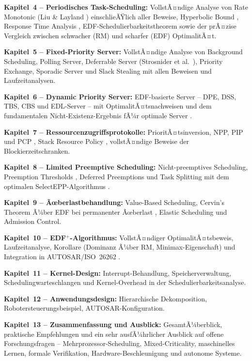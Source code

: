 ﻿\documentclass[a4paper,12pt]{report}
\theoremstyle{definition}
\begin{document}
\textbf{Kapitel~4 -- Periodisches Task-Scheduling:} VollstÃ¤ndige Analyse von
Rate Monotonic (Liu \& Layland \cite{Liu1973}) einschlieÃŸlich aller Beweise,
Hyperbolic Bound \cite{Bini2001}, Response Time Analysis \cite{Audsley1993},
EDF-Schedulierbarkeitstheorem \cite{Baruah1990} sowie der prÃ¤zise Vergleich
zwischen schwacher (RM) und scharfer (EDF) OptimalitÃ¤t.

\textbf{Kapitel~5 -- Fixed-Priority Server:} VollstÃ¤ndige Analyse von
Background Scheduling, Polling Server, Deferrable Server (Strosnider et al.\
\cite{Strosnider1995}), Priority Exchange, Sporadic Server \cite{Sprunt1989}
und Slack Stealing \cite{Lehoczky1992} mit allen Beweisen und Laufzeitanalysen.

\textbf{Kapitel~6 -- Dynamic Priority Server:} EDF-basierte Server -- DPE,
DSS, TBS, CBS \cite{Abeni1998} und EDL-Server -- mit OptimalitÃ¤tsnachweisen
und dem fundamentalen Nicht-Existenz-Ergebnis fÃ¼r optimale Server \cite{Tia1995}.

\textbf{Kapitel~7 -- Ressourcenzugriffsprotokolle:} PrioritÃ¤tsinversion, NPP,
PIP und PCP \cite{Sha1990}, Stack Resource Policy \cite{Baker1991}, vollstÃ¤ndige
Beweise der Blockierzeitschranken.

\textbf{Kapitel~8 -- Limited Preemptive Scheduling:} Nicht-preemptives Scheduling,
Preemption Thresholds \cite{Wang1999}, Deferred Preemptions und Task Splitting
mit dem optimalen SelectEPP-Algorithmus \cite{Bertogna2011}.

\textbf{Kapitel~9 -- Ãœberlastbehandlung:} Value-Based Scheduling, Cervin's
Theorem Ã¼ber EDF bei permanenter Ãœberlast \cite{Cervin2003}, Elastic Scheduling
und Admission Control.

\textbf{Kapitel~10 -- EDF$^+$-Algorithmus:} VollstÃ¤ndiger OptimalitÃ¤tsbeweis,
Laufzeitanalyse, Korollare (Dominanz Ã¼ber RM, Minimax-Eigenschaft) und
Integration in AUTOSAR/ISO~26262 \cite{Epp2026}.

\textbf{Kapitel~11 -- Kernel-Design:} Interrupt-Behandlung, Speicherverwaltung,
Schedulingwarteschlangen und Kernel-Overhead in der Schedulierbarkeitsanalyse.

\textbf{Kapitel~12 -- Anwendungsdesign:} Hierarchische Dekomposition,
Robotersteuerungsbeispiel, AUTOSAR-Konfiguration.

\textbf{Kapitel~13 -- Zusammenfassung und Ausblick:} GesamtÃ¼berblick,
praktische Empfehlungen und ein sehr ausfÃ¼hrlicher Ausblick auf offene
Forschungsfragen -- Mehrprozessor-Scheduling, Mixed-Criticality, maschinelles
Lernen, formale Verifikation, Hardware-Beschleunigung und autonome Systeme.
\end{document}
